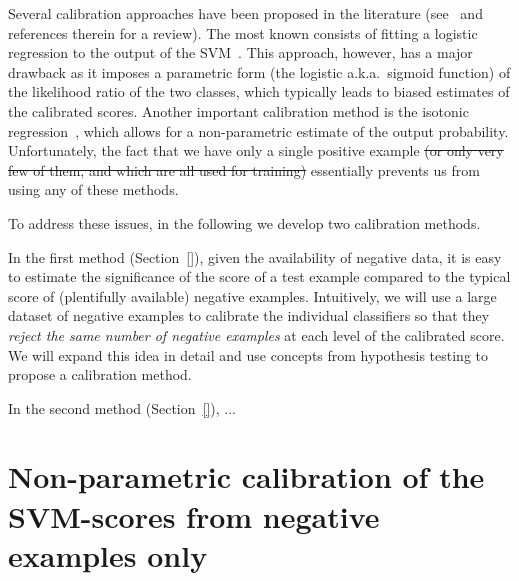    Several calibration approaches have been proposed in the literature (see~\cite{gebel2007calibrating} and references therein for a review). The most known consists of fitting a logistic regression to the output of the SVM~\cite{Platt99}.  This approach, however, has a major drawback as it imposes a parametric form (the logistic a.k.a.\ sigmoid function) of the likelihood ratio of the two classes, which typically leads to biased estimates of the calibrated scores. Another important calibration method is the isotonic regression~\cite{zadrozny2002transforming}, which allows for a non-parametric estimate of the output probability.
   Unfortunately, the fact that we have only a single positive example \sout{(or only very few of them, and which are all used for training)} essentially prevents us from using any of these methods. 

To address these issues, in the following we develop two calibration methods.

In the first method (Section~\ref{}), given the availability of negative data, it is easy to estimate the significance of the score of a test example compared to the typical score of (plentifully available) negative examples. Intuitively, we will use a large dataset of negative examples to calibrate the individual classifiers so that they {\em reject the same number of negative examples} at each level of the calibrated score.   We will expand this idea in detail and use concepts from hypothesis testing to propose a calibration method.

In the second method (Section~\ref{}), ... 


    
\section{Non-parametric calibration of the  SVM-scores from negative examples only}
\label{sec:calibration}




